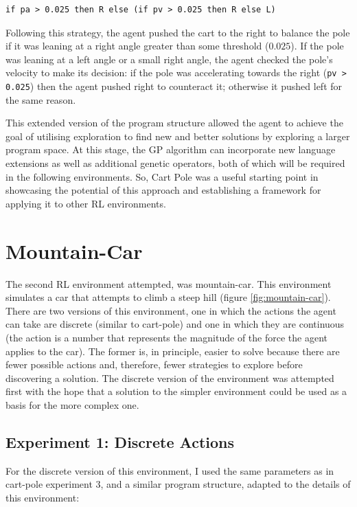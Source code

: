 \begin{verbatim}
if pa > 0.025 then R else (if pv > 0.025 then R else L)
\end{verbatim}

Following this strategy, the agent pushed the cart to the right to balance the pole if it was leaning at a right angle greater than some threshold ($0.025$). If the pole was leaning at a left angle or a small right angle, the agent checked the pole's velocity to make its decision: if the pole was accelerating towards the right (\verb+pv > 0.025+) then the agent pushed right to counteract it; otherwise it pushed left for the same reason.

This extended version of the program structure allowed the agent to achieve the goal of utilising exploration to find new and better solutions by exploring a larger program space. At this stage, the GP algorithm can incorporate new language extensions as well as additional genetic operators, both of which will be required in the following environments. So, Cart Pole was a useful starting point in showcasing the potential of this approach and establishing a framework for applying it to other RL environments.

\section{Mountain-Car}
The second RL environment attempted, was mountain-car. This environment simulates a car that attempts to climb a steep hill (figure \ref{fig:mountain-car}). There are two versions of this environment, one in which the actions the agent can take are discrete (similar to cart-pole) and one in which they are continuous (the action is a number that represents the magnitude of the force the agent applies to the car). The former is, in principle, easier to solve because there are fewer possible actions and, therefore, fewer strategies to explore before discovering a solution. The discrete version of the environment was attempted first with the hope that a solution to the simpler environment could be used as a basis for the more complex one.

\subsection{Experiment 1: Discrete Actions}
For the discrete version of this environment, I used the same parameters as in cart-pole experiment 3, and a similar program structure, adapted to the details of this environment:

